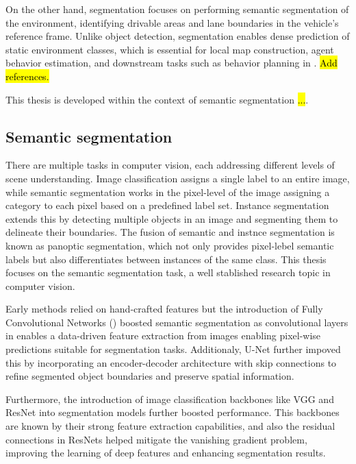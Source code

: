 On the other hand,  segmentation focuses on performing semantic segmentation of the environment, identifying drivable areas and lane boundaries in the vehicle's reference frame. Unlike object detection,  segmentation enables dense prediction of static environment classes, which is essential for local map construction, agent behavior estimation, and downstream tasks such as behavior planning in . \hl{Add references.}

This thesis is developed within the context of  semantic segmentation \hl{...}.

\subsection{Semantic segmentation} \label{sota_semantic_segmentation}
There are multiple tasks in computer vision, each addressing different levels of scene understanding. Image classification assigns a single label to an entire image, while semantic segmentation works in the pixel-level of the image assigning a category to each pixel based on a predefined label set. Instance segmentation extends this by detecting multiple objects in an image and segmenting them to delineate their boundaries. The fusion of semantic and instnce segmentation is known as panoptic segmentation, which not only provides pixel-lebel semantic labels but also differentiates between instances of the same class. This thesis focuses on the semantic segmentation task, a well stablished research topic in computer vision.

Early methods relied on hand-crafted features but the introduction of Fully Convolutional Networks () \cite{FCNs} boosted semantic segmentation as convolutional layers in  enables a data-driven feature extraction from images enabling pixel-wise predictions suitable for segmentation tasks. Additionaly, U-Net \cite{u_net} further impoved this by incorporating an encoder-decoder architecture with skip connections to refine segmented object boundaries and preserve spatial information.

Furthermore, the introduction of image classification backbones like VGG \cite{VGG} and ResNet \cite{ResNet} into segmentation models further boosted performance. This backbones are known by their strong feature extraction capabilities, and also the residual connections in ResNets helped mitigate the vanishing gradient problem, improving the learning of deep features and enhancing segmentation results.

